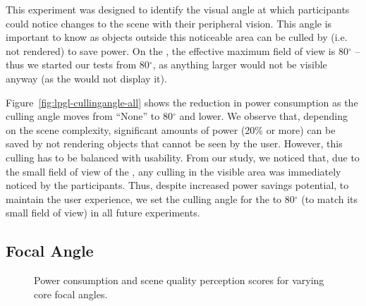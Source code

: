 This experiment was designed to identify the visual angle at which participants could notice changes to the scene with their peripheral vision. This angle is important to know as objects outside this noticeable area can be culled by {\myit} (i.e. not rendered) to save power. On the {\mlo}, the effective maximum field of view is 80$^\circ$ -- thus we started our tests from 80$^\circ$, as anything larger would not be visible anyway (as the {\mlo} would not display it).

Figure~\ref{fig:lpgl-cullingangle-all} shows the reduction in power consumption as the culling angle moves from ``None'' to 80$^\circ$ and lower. We observe that, depending on the scene complexity, significant amounts of power (20\% or more) can be saved by not rendering objects that cannot be seen by the user. However, this culling has to be balanced with usability. From our study, we noticed that, due to the small field of view of the {\mlo}, any culling in the visible area was immediately noticed by the participants. Thus, despite increased power savings potential, to maintain the user experience, we set the culling angle for the {\mlo} to 80$^\circ$ (to match its small field of view) in all future experiments.





\subsection{Focal Angle}


\begin{figure}[t]
    \centering
    \vspace{-1ex}
    \vspace{-2ex}
    \caption{Power consumption and scene quality perception scores for
            varying core focal angles.}
    \label{fig:lpgl-focusangle-all}
\end{figure}

